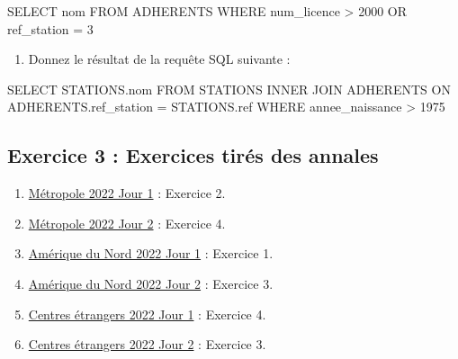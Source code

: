 \documentclass[
  letterpaper,
  DIV=11,
  numbers=noendperiod]{scrartcl}
\newenvironment{Shaded}{\begin{snugshade}}{\end{snugshade}}
\newcommand{\DecValTok}[1]{\textcolor[rgb]{0.68,0.00,0.00}{#1}}
\newcommand{\FunctionTok}[1]{\textcolor[rgb]{0.28,0.35,0.67}{#1}}
\newcommand{\KeywordTok}[1]{\textcolor[rgb]{0.00,0.23,0.31}{#1}}
\newcommand{\NormalTok}[1]{\textcolor[rgb]{0.00,0.23,0.31}{#1}}
\newcommand{\OperatorTok}[1]{\textcolor[rgb]{0.37,0.37,0.37}{#1}}
\providecommand{\tightlist}{%
  \setlength{\itemsep}{0pt}\setlength{\parskip}{0pt}}\usepackage{longtable,booktabs,array}
\begin{document}
\begin{Shaded}
\begin{Highlighting}[]
\KeywordTok{SELECT}\NormalTok{ nom }
\KeywordTok{FROM}\NormalTok{ ADHERENTS }
\KeywordTok{WHERE}\NormalTok{ num\_licence }\OperatorTok{\textgreater{}} \DecValTok{2000} \KeywordTok{OR}\NormalTok{  ref\_station }\OperatorTok{=} \DecValTok{3}
\end{Highlighting}
\end{Shaded}

\begin{enumerate}
\def\labelenumi{\arabic{enumi}.}
\setcounter{enumi}{4}
\tightlist
\item
  Donnez le résultat de la requête SQL suivante :
\end{enumerate}

\begin{Shaded}
\begin{Highlighting}[]
\KeywordTok{SELECT}\NormalTok{ STATIONS.nom}
\KeywordTok{FROM}\NormalTok{ STATIONS}
\KeywordTok{INNER} \KeywordTok{JOIN}\NormalTok{ ADHERENTS }\KeywordTok{ON}\NormalTok{ ADHERENTS.ref\_station }\OperatorTok{=}\NormalTok{ STATIONS.}\FunctionTok{ref}
\KeywordTok{WHERE}\NormalTok{ annee\_naissance }\OperatorTok{\textgreater{}} \DecValTok{1975}
\end{Highlighting}
\end{Shaded}

\hypertarget{fa-solid-pencil-alt-exercice-3-exercices-tiruxe9s-des-annales}{%
\subsection{\texorpdfstring{ Exercice 3 : Exercices
tirés des
annales}{ Exercice 3 : Exercices tirés des annales}}\label{fa-solid-pencil-alt-exercice-3-exercices-tiruxe9s-des-annales}}

\begin{enumerate}
\def\labelenumi{\arabic{enumi}.}
\tightlist
\item
  \href{../annales/2022_Metropole_Jour1.pdf}{Métropole 2022 Jour 1} :
  Exercice 2.
\item
  \href{../annales/2022_Metropole_Jour2.pdf}{Métropole 2022 Jour 2} :
  Exercice 4.
\item
  \href{../annales/2022_AmeriqueDuNord_1.pdf}{Amérique du Nord 2022 Jour
  1} : Exercice 1.
\item
  \href{../annales/2022_AmeriqueDuNord_2.pdf}{Amérique du Nord 2022 Jour
  2} : Exercice 3.
\item
  \href{../annales/2022_CentresEtrangers_1.pdf}{Centres étrangers 2022
  Jour 1} : Exercice 4.
\item
  \href{../annales/2022_CentresEtrangers_2.pdf}{Centres étrangers 2022
  Jour 2} : Exercice 3.
\end{enumerate}
\end{document}
